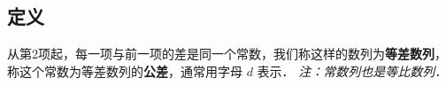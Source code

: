 
\subsection{定义}
从第2项起，每一项与前一项的差是同一个常数，我们称这样的数列为\textbf{等差数列}，称这个常数为等差数列的\textbf{公差}，通常用字母 $d$ 表示．
\textsl{注：常数列也是等比数列．}